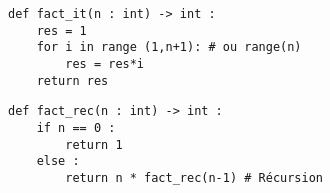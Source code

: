 


\begin{lstlisting}
def fact_it(n : int) -> int :
    res = 1
    for i in range (1,n+1): # ou range(n)
        res = res*i
    return res
\end{lstlisting}




\begin{lstlisting}
def fact_rec(n : int) -> int :
    if n == 0 : 
        return 1
    else : 
        return n * fact_rec(n-1) # Récursion
\end{lstlisting}
